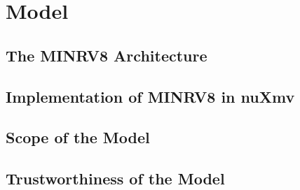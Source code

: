 \section{Model}
\label{sec:model}

\subsection{The MINRV8 Architecture}

\subsection{Implementation of MINRV8 in nuXmv}

\subsection{Scope of the Model}

\subsection{Trustworthiness of the Model}
